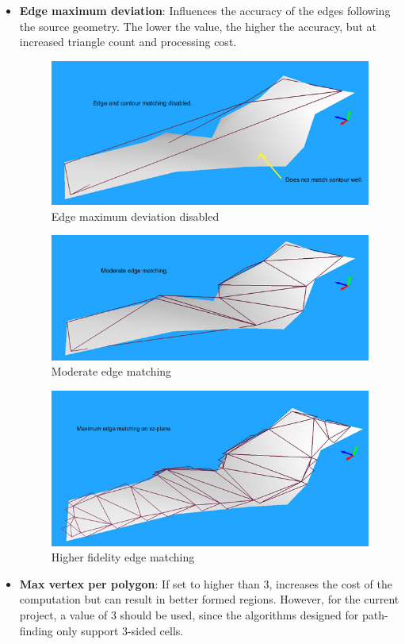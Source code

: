 \begin{itemize}
  \item\textbf{Edge maximum deviation}: Influences the accuracy of the edges following the source geometry. The lower the value, the higher the accuracy, but at increased triangle count and processing cost.
  
  \begin{figure}[H]
	\centering
	\includegraphics[width=1\textwidth]{../images/edge_dev_0.png}
	\caption{Edge maximum deviation disabled}
\end{figure}
\begin{figure}[H]
	\centering
	\includegraphics[width=1\textwidth]{../images/edge_dev_1.png}
	\caption{Moderate edge matching}
\end{figure}
\begin{figure}[H]
	\centering
	\includegraphics[width=1\textwidth]{../images/edge_dev_2.png}
	\caption{Higher fidelity edge matching}
\end{figure}
  
  
  \item\textbf{Max vertex per polygon}: If set to higher than 3, increases the cost of the computation but can result in better formed regions. However, for the current project, a value of 3 should be used, since the algorithms designed for path-finding only support 3-sided cells.
\end{itemize}
	

